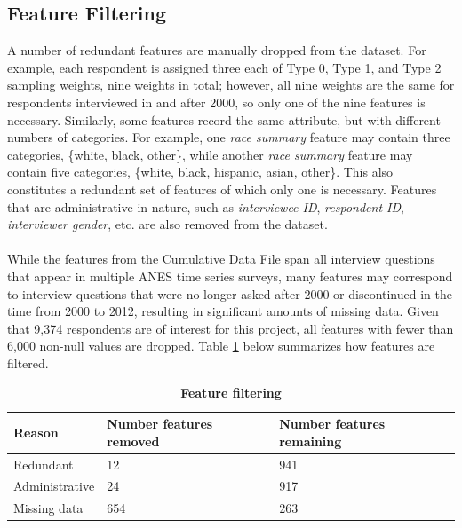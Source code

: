 \documentclass{article}
\begin{document}
	\subsection{Feature Filtering}
	A number of redundant features are manually dropped from the dataset. For example, each respondent is assigned three each of Type 0, Type 1, and Type 2 sampling weights, nine weights in total; however, all nine weights are the same for respondents interviewed in and after 2000, so only one of the nine features is necessary. Similarly, some features record the same attribute, but with different numbers of categories. For example, one \textit{race summary} feature may contain three categories, \{white, black, other\}, while another \textit{race summary} feature may contain five categories, \{white, black, hispanic, asian, other\}. This also constitutes a redundant set of features of which only one is necessary. Features that are administrative in nature, such as \textit{interviewee ID}, \textit{respondent ID}, \textit{interviewer gender}, etc. are also removed from the dataset.
	\\\\
	While the features from the Cumulative Data File span all interview questions that appear in multiple ANES time series surveys, many features may correspond to interview questions that were no longer asked after 2000 or discontinued in the time from 2000 to 2012, resulting in significant amounts of missing data. Given that 9,374 respondents are of interest for this project, all features with fewer than 6,000 non-null values are dropped. Table \ref{table:feature_filtering} below summarizes how features are filtered.
		
	\begin{table}[h!]
		\begin{center}
			\begin{tabular}{ |m{4.5cm}|m{2cm}|m{2cm}| } 
				\hline
				Reason & Number features removed & Number features remaining  \\ 
				\hline
				Redundant & 12 & 941 \\ 
				\hline
				Administrative & 24 & 917 \\ 
				\hline
				Missing data & 654 & 263 \\
				\hline		
			\end{tabular}
			\caption{\textbf{Feature filtering}}
			\label{table:feature_filtering}
		\end{center}
	\end{table}
\end{document}
